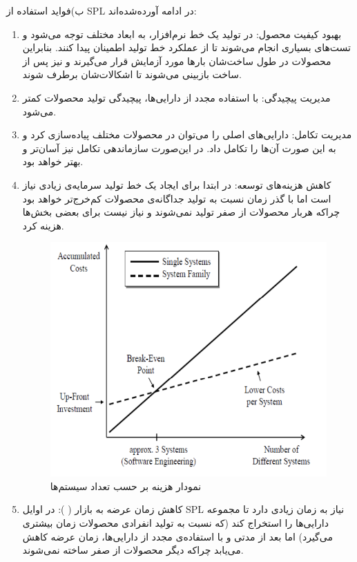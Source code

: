 {ب)فواید استفاده از SPL در ادامه آورده‌شده‌اند:
\begin{enumerate}

\item 
بهبود کیفیت محصول: در تولید یک خط نرم‌افزار، به ابعاد مختلف توجه می‌شود و تست‌های بسیاری انجام می‌شوند تا از عملکرد خط تولید اطمینان پیدا کنند. بنابراین محصولات در طول ساخت‌شان بارها مورد آزمایش قرار می‌گیرند و نیز پس از ساخت‌ بازبینی می‌شوند تا اشکالات‌شان برطرف شوند.
\item 
مدیریت پیچیدگی: با استفاده‌ مجدد از دارایی‌ها، پیچیدگی تولید محصولات کمتر می‌شود.
\item
مدیریت تکامل: دارایی‌های اصلی را می‌توان در محصولات مختلف پیاده‌سازی کرد و به این صورت آن‌ها را تکامل داد. در این‌صورت سازماندهی تکامل نیز آسان‌تر و بهتر خواهد بود.
\item 
کاهش هزینه‌های توسعه: در ابتدا برای ایجاد یک خط تولید سرمایه‌ی زیادی نیاز است اما با گذر زمان نسبت به تولید جداگانه‌ی محصولات کم‌خرج‌تر خواهد بود چراکه هربار محصولات از صفر تولید نمی‌شوند و نیاز نیست برای بعضی بخش‌ها هزینه‌ کرد.
\begin{figure}[h]
	\centering
	\includegraphics[scale=0.55]{figs/1-1}
	\caption{نمودار هزینه‌ بر حسب تعداد سیستم‌ها}
\end{figure}

\item 
کاهش زمان عرضه به بازار  (  ):
در اوایل SPL نیاز به زمان زیادی دارد تا مجموعه دارایی‌ها را استخراج کند (که نسبت به تولید انفرادی محصولات زمان بیشتری می‌گیرد) اما بعد از مدتی و با استفاده‌ی مجدد از دارایی‌ها، زمان عرضه کاهش می‌یابد چراکه دیگر محصولات از صفر ساخته نمی‌شوند.


\end{enumerate}}
